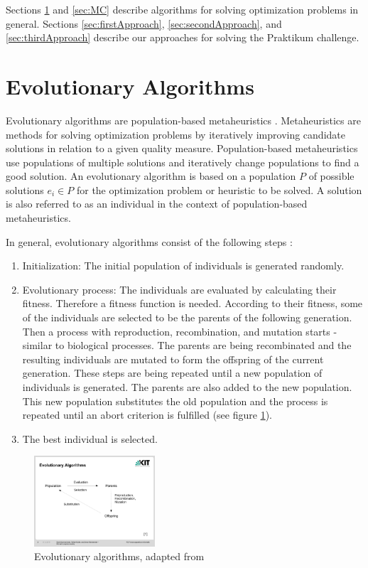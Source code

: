 \documentclass[10pt,twocolumn,letterpaper]{article}
\begin{document}
Sections \ref{sec:EA} and \ref{sec:MC} describe algorithms for solving optimization problems in general. Sections \ref{sec:firstApproach}, \ref{sec:secondApproach}, and \ref{sec:thirdApproach} describe our approaches for solving the Praktikum challenge.


\section{Evolutionary Algorithms} \label{sec:EA}

Evolutionary algorithms are population-based metaheuristics \cite{EA}. Metaheuristics are methods for solving optimization problems by iteratively improving candidate solutions in relation to a given quality measure.
Population-based metaheuristics use populations of multiple solutions and iteratively change populations to find a good solution.
An evolutionary algorithm is based on a population $P$ of possible solutions $e_i \in P$ for the optimization problem or heuristic to be solved. A solution is also referred to as an individual in the context of population-based metaheuristics.

In general, evolutionary algorithms consist of the following steps \cite{EA}:

\begin{enumerate}
\item Initialization: The initial population of individuals is generated randomly.

\item Evolutionary process: The individuals are evaluated by calculating their fitness. Therefore a fitness function is needed.
According to their fitness, some of the individuals are selected to be the parents of the following generation.
Then a process with reproduction, recombination, and mutation starts - similar to biological processes.
The parents are being recombinated and the resulting individuals are mutated to form the offspring of the current generation.
These steps are being repeated until a new population of individuals is generated. The parents are also added to the new population. This new population substitutes the old population and the process is repeated until an abort criterion is fulfilled  (see figure \ref{fig:EA}).

\item The best individual is selected.
\end{enumerate}


\begin{figure}
	\begin{center}
		\includegraphics[trim = 2.2cm 6cm 4.2cm 6cm, clip, width=0.4\textwidth]{EA}
	\end{center}
	\caption{Evolutionary algorithms, adapted from \cite{EA}}
	\label{fig:EA}
\end{figure}
\end{document}
